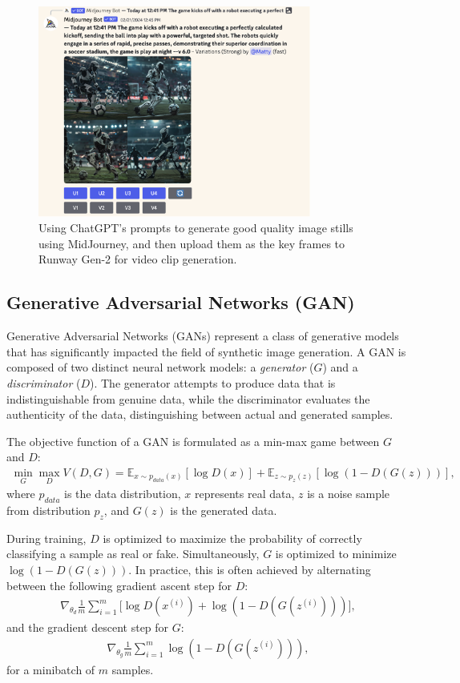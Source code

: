 \documentclass[11pt,a4paper,oneside]{report}
\begin{document}
\begin{figure}[htbp]
  \centering
  \includegraphics[width=0.8\textwidth]{mj.png}
  \caption{Using ChatGPT's prompts to generate good quality image stills using MidJourney, and then upload them as the key frames to Runway Gen-2 for video clip generation.}
\end{figure}

\subsection{Generative Adversarial Networks (GAN)}

Generative Adversarial Networks (GANs) represent a class of generative models that has significantly impacted the field of synthetic image generation. A GAN is composed of two distinct neural network models: a \textit{generator} ($G$) and a \textit{discriminator} ($D$). The generator attempts to produce data that is indistinguishable from genuine data, while the discriminator evaluates the authenticity of the data, distinguishing between actual and generated samples.

The objective function of a GAN is formulated as a min-max game between $G$ and $D$:
\begin{align}
\min_{G} \max_{D} V(D, G) = \mathbb{E}_{x\sim p_{data}(x)}[\log D(x)] + \mathbb{E}_{z\sim p_{z}(z)}[\log (1 - D(G(z)))],
\end{align}
where $p_{data}$ is the data distribution, $x$ represents real data, $z$ is a noise sample from distribution $p_z$, and $G(z)$ is the generated data.

During training, $D$ is optimized to maximize the probability of correctly classifying a sample as real or fake. Simultaneously, $G$ is optimized to minimize $\log(1 - D(G(z)))$. In practice, this is often achieved by alternating between the following gradient ascent step for $D$:
\begin{align}
\nabla_{\theta_d} \frac{1}{m} \sum_{i=1}^{m} \Big[ \log D(x^{(i)}) + \log (1 - D(G(z^{(i)}))) \Big],
\end{align}
and the gradient descent step for $G$:
\begin{align}
\nabla_{\theta_g} \frac{1}{m} \sum_{i=1}^{m} \log (1 - D(G(z^{(i)}))),
\end{align}
for a minibatch of $m$ samples.
\end{document}

